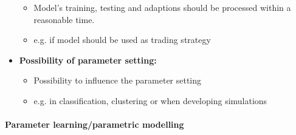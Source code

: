 \documentclass[a4paper, landscape, 6pt, fleqn]{scrartcl}
\renewcommand{\emph}[1]{\textbf{#1}}
\begin{document}
\begin{multicols*}{4}
\begin{itemize}
\begin{itemize}
\item Model's training, testing and adaptions should be processed within a reasonable time.
\item e.g. if model should be used as trading strategy
\end{itemize}
\item \emph{Possibility of parameter setting:}
\begin{itemize}
\item Possibility to influence the parameter setting
\item e.g. in classification, clustering or when developing simulations
\end{itemize}
\end{itemize}

\paragraph{Parameter learning/parametric modelling}


\end{multicols*}
\end{document}
